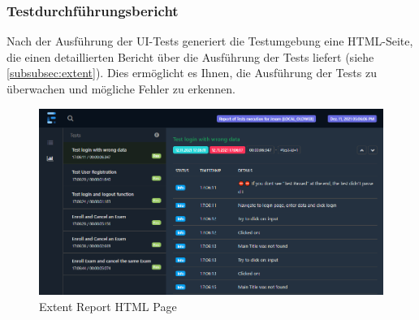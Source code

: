 \subsubsection{Testdurchführungsbericht}
Nach der Ausführung der UI-Tests generiert die Testumgebung eine
HTML-Seite, die einen detaillierten Bericht über die Ausführung
der Tests liefert (siehe \autoref{subsubsec:extent}). Dies ermöglicht es
Ihnen, die Ausführung der Tests zu überwachen und mögliche Fehler
zu erkennen.

\begin{figure}[H]
    \centering
    \includegraphics[scale=0.6]{images/ExtentReport}
    \caption{Extent Report HTML Page} \label{fig:ext-rep}
\end{figure}